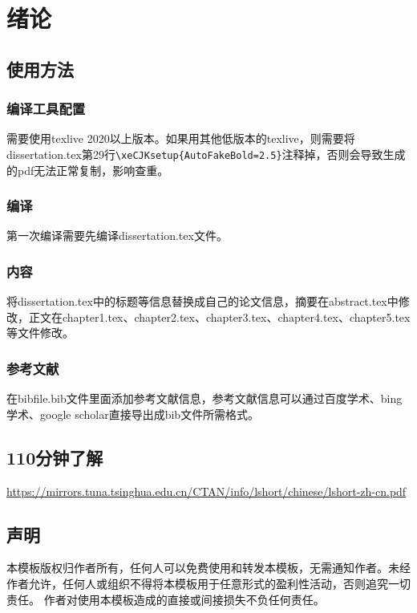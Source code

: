 \chapter{绪论}
\section{使用方法}
\subsection{编译工具配置}
需要使用texlive 2020以上版本。如果用其他低版本的texlive，则需要将dissertation.tex第29行\verb|\xeCJKsetup{AutoFakeBold=2.5}|注释掉，否则会导致生成的pdf无法正常复制，影响查重。

\subsection{编译}
第一次编译需要先编译dissertation.tex文件。

\subsection{内容}
将dissertation.tex中的标题等信息替换成自己的论文信息，摘要在abstract.tex中修改，正文在chapter1.tex、chapter2.tex、chapter3.tex、chapter4.tex、chapter5.tex等文件修改。

\subsection{参考文献}
在bibfile.bib文件里面添加参考文献信息，参考文献信息可以通过百度学术、bing学术、google scholar直接导出成bib文件所需格式。

\section{110分钟了解\LaTeXe}
\href{https://mirrors.tuna.tsinghua.edu.cn/CTAN/info/lshort/chinese/lshort-zh-cn.pdf}{https://mirrors.tuna.tsinghua.edu.cn/CTAN/info/lshort/chinese/lshort-zh-cn.pdf}

\section{声明}
本模板版权归作者所有，任何人可以免费使用和转发本模板，无需通知作者。未经作者允许，任何人或组织不得将本模板用于任意形式的盈利性活动，否则追究一切责任。
作者对使用本模板造成的直接或间接损失不负任何责任。
